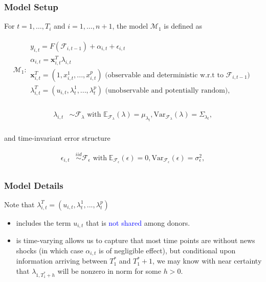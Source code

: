 \documentclass[9pt]{beamer}
\newcommand{\x}{\textbf{x}}
\newcommand{\simiid}{\stackrel{iid}{\sim}} %
\def\mrm#1{\mathrm{#1}} %
\def\mc#1{\mathcal{#1}} %
\def\E{\mathbb{E}} %
\def\mc#1{\mathcal{#1}}
\theoremstyle{definition}
\begin{document}
    \begin{frame}\frametitle{Model Setup}
    
    \fontsize{8}{7.2}
    
    For $t= 1, \ldots, T_i$ and $i = 1, \ldots, n+1$, the model $\mc{M}_1$ is defined as 

    \begin{align}
        \mc{M}_1 \colon 
    \begin{array}{l}
          y_{i,t} = F(\mathcal{F}_{i,t-1}) + \alpha_{i,t} + \epsilon_{i,t}\\[.2cm]
          \alpha_{i,t} = \x^{T}_{i,t}\lambda_{i,t} \\[.2cm]
         \x_{i,t}^{T} = (1,x^{1}_{i,t},...,x^{p}_{i,t}) \text{ (observable and deterministic w.r.t to } \mathcal{F}_{i,t-1})\\[.2cm] 
         \lambda_{i,t}^{T} = (u_{i,t},\lambda^{1}_{t},...,\lambda^{p}_{t}) \text{ (unobservable and potentially random)},\\[.2cm]
        \end{array}
    \end{align}

    \begin{align*}
    \lambda_{i,t} &\sim \mc{F}_{\lambda}\text{ with }  \E_{\mathcal{F}_{\lambda}}(\lambda) = \mu_{\lambda_{t}}, \mrm{Var}_{\mc{F}_{\lambda}}(\lambda) = \Sigma_{\lambda_{t}},\\
    \end{align*}

    and time-invariant error structure

    \begin{align*}
        \epsilon_{i,t} &\simiid \mc{F}_{\epsilon} \text{ with}  \; \E_{\mc{F}_{\epsilon}}(\epsilon) = 0, \mrm{Var}_{\mc{F}_{\epsilon}}(\epsilon)  = \sigma^{2}_{\epsilon},  \\
    \end{align*}
    
    \end{frame}

    \begin{frame}\frametitle{Model Details}
        Note that $\lambda_{i,t}^{T} = (u_{i,t},\lambda^{1}_{t},...,\lambda^{p}_{t})$
        \begin{itemize}
            
            \item includes the term $u_{i,t}$ that is \textcolor{blue}{not shared} among donors.
            \item is time-varying allows us to capture that most time points are without news shocks (in which case $\alpha_{i,t}$ is of negligible effect), but conditional upon information arriving between $T_{1}^{*}$ and $T_{1}^{*}+1$, we may know with near certainty that $\lambda_{1,T_{1}^{*}+h}$ will be nonzero in norm for some $h>0$. 
        \end{itemize}
    \end{frame}
    
\end{document}

